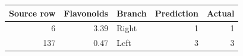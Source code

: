 \begin{tabular}{@{}rrlrr@{}}
\toprule
Source row & Flavonoids & Branch & Prediction & Actual \\
\midrule
6 & 3.39 & Right & 1 & 1 \\
137 & 0.47 & Left & 3 & 3 \\
\bottomrule
\end{tabular}

